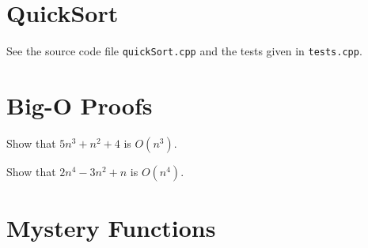 \documentclass{article}
\begin{document}
    \section{QuickSort}

    See the source code file \texttt{quickSort.cpp} and the tests given in
    \texttt{tests.cpp}.

    \section{Big-O Proofs}

    \vspace{2mm}
     Show that $5n^3+n^2+4$ is $O(n^3)$.


    \vspace{1cm}
     Show that $2n^4-3n^2+n$ is $O(n^4)$.



    \vspace{1cm}
    \section{Mystery Functions}




    
\end{document}
